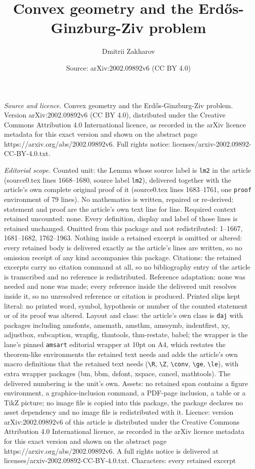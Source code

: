 \documentclass[10pt,a4paper]{amsart}
\title[Convex geometry and the Erd\H{o}s-Ginzburg-Ziv problem]{Convex geometry and the Erd\H{o}s-Ginzburg-Ziv problem}
\author{Dmitrii Zakharov}
\date{Source: arXiv:2002.09892v6 (CC BY 4.0)}
\begin{document}
\maketitle

\noindent\emph{Source and licence.} Convex geometry and the Erd\H{o}s-Ginzburg-Ziv problem. Version arXiv:2002.09892v6 (CC BY 4.0), distributed under the Creative Commons Attribution 4.0 International licence, as recorded in the arXiv licence metadata for this exact version and shown on the abstract page https://arxiv.org/abs/2002.09892v6. Full rights notice: licenses/arxiv-2002.09892-CC-BY-4.0.txt.\par\smallskip

\noindent\textit{Editorial scope.} Counted unit: the Lemma whose source label is \texttt{lm2} in the article (source0.tex lines 1668--1680, source label \texttt{lm2}), delivered together with the article's own complete original proof of it (source0.tex lines 1683--1761, one \texttt{proof} environment of 79 lines). No mathematics is written, repaired or re-derived: statement and proof are the article's own text line for line. Required context retained uncounted: none. Every definition, display and label of those lines is retained unchanged. Omitted from this package and not redistributed: 1--1667, 1681--1682, 1762--1963. Nothing inside a retained excerpt is omitted or altered: every retained body is delivered exactly as the article's lines are written, so no omission receipt of any kind accompanies this package. Citations: the retained excerpts carry no citation command at all, so no bibliography entry of the article is transcribed and no reference is redistributed. Reference adaptation: none was needed and none was made; every reference inside the delivered unit resolves inside it, so no unresolved reference or citation is produced. Printed slips kept literal: no printed word, symbol, hypothesis or number of the counted statement or of its proof was altered. Layout and class: the article's own class is \texttt{daj} with packages including amsfonts, amsmath, amsthm, amssymb, indentfirst, xy, adjustbox, subcaption, wrapfig, thmtools, thm-restate, babel; the wrapper is the lane's pinned \texttt{amsart} editorial wrapper at 10pt on A4, which restates the theorem-like environments the retained text needs and adds the article's own macro definitions that the retained text needs (\texttt{\textbackslash R}, \texttt{\textbackslash Z}, \texttt{\textbackslash conv}, \texttt{\textbackslash ge}, \texttt{\textbackslash le}), with extra wrapper packages (bm, bbm, dsfont, xspace, cancel, mathtools). The delivered numbering is the unit's own. Assets: no retained span contains a figure environment, a graphics-inclusion command, a PDF-page inclusion, a table or a TikZ picture; no image file is copied into this package, the package declares no asset dependency and no image file is redistributed with it. Licence: version arXiv:2002.09892v6 of this article is distributed under the Creative Commons Attribution 4.0 International licence, as recorded in the arXiv licence metadata for this exact version and shown on the abstract page https://arxiv.org/abs/2002.09892v6. A full rights notice is delivered at licenses/arxiv-2002.09892-CC-BY-4.0.txt. Characters: every retained excerpt 
\end{document}
